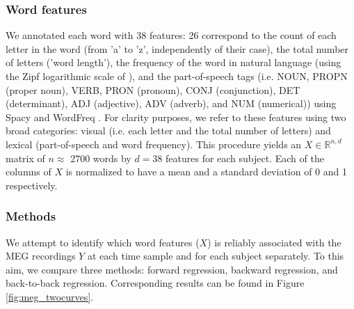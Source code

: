 \subsubsection{Word features} We annotated each word with 38 features: 26
correspond to the count of each letter in the word (from 'a' to 'z',
independently of their case), the total number of letters ('word length'), the
frequency of the word in natural language (using the Zipf logarithmic scale
of \citep{van2014subtlex}), and the part-of-speech tags (i.e. NOUN, PROPN (proper
noun), VERB, PRON (pronoun), CONJ (conjunction), DET (determinant), ADJ
(adjective), ADV (adverb), and NUM (numerical)) using Spacy \citep{spacy2} and
WordFreq \citep{speerwordfreq}. For clarity purposes, we refer to these
features using two broad categories: visual (i.e. each letter and the total
number of letters) and lexical (part-of-speech and word frequency). This
procedure yields an $X \in \mathbb{R}^{n, d}$ matrix of $n\approx$ 2700 words by
$d=38$ features for each subject. Each of the columns of $X$ is normalized to
have a mean and a standard deviation of 0 and 1 respectively.

\subsubsection{Methods}

We attempt to identify which word features ($X$) is reliably associated with the MEG recordings $Y$ at each time sample and for each subject separately. To this aim,
we compare three methods: forward regression, backward regression, and back-to-back regression.
Corresponding results can be found in Figure \ref{fig:meg_twocurves}.

